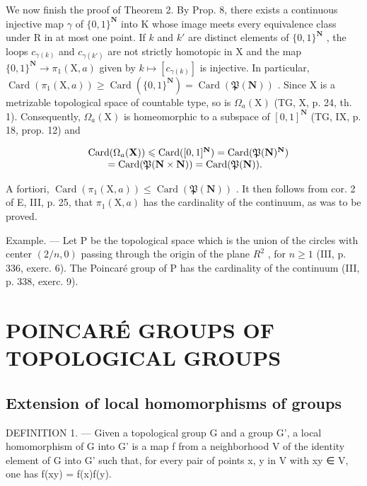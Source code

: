 We now finish the proof of Theorem 2. By Prop. 8, there exists a continuous injective map \(\gamma\) of \(\{0,1\}^{\mathbf{N}}\) into K whose image meets every equivalence class under R in at most one point. If \(k\) and \(k'\) are distinct elements of \(\{0,1\}^{\mathbf{N}}\) , the loops \(c_{\gamma(k)}\) and \(c_{\gamma(k')}\) are not strictly homotopic in X and the map \(\{0,1\}^{\mathbf{N}} \to \pi_1(\mathrm{X},a)\) given by \(k \mapsto [c_{\gamma(k)}]\) is injective. In particular, \(\operatorname{Card}(\pi_1(\mathrm{X},a)) \geqslant \operatorname{Card}(\{0,1\}^{\mathbf{N}}) = \operatorname{Card}(\mathfrak{P}(\mathbf{N}))\) . Since X is a metrizable topological space of countable type, so is \(\Omega_a(\mathrm{X})\) (TG, X, p. 24, th. 1). Consequently, \(\Omega_a(\mathrm{X})\) is homeomorphic to a subspace of \([0,1]^{\mathbf{N}}\) (TG, IX, p. 18, prop. 12) and

\[
\begin{array}{r l} & {\mathrm{Card} (\Omega_ {a} (\mathbf {X})) \leqslant \mathrm{Card} ([ 0, 1 ] ^ {\mathbf {N}}) = \mathrm{Card} (\mathfrak {P} (\mathbf {N}) ^ {\mathbf {N}})} \\ & {\qquad = \mathrm{Card} (\mathfrak {P} (\mathbf {N} \times \mathbf {N})) = \mathrm{Card} (\mathfrak {P} (\mathbf {N})).} \end{array}
\]

A fortiori, \(\operatorname{Card}(\pi_{1}(\mathrm{X},a))\leqslant\operatorname{Card}(\mathfrak{P}(\mathbf{N}))\) . It then follows from cor. 2 of E, III, p. 25, that \(\pi_{1}(\mathrm{X},a)\) has the cardinality of the continuum, as was to be proved.

Example. --- Let P be the topological space which is the union of the circles with center \((2/n,0)\) passing through the origin of the plane \(R^{2}\) , for \(n \geqslant 1\) (III, p. 336, exerc. 6). The Poincaré group of P has the cardinality of the continuum (III, p. 338, exerc. 9).

\section{POINCARÉ GROUPS OF TOPOLOGICAL GROUPS}

\subsection{Extension of local homomorphisms of groups}

DEFINITION 1. --- Given a topological group G and a group G', a local homomorphism of G into G' is a map f from a neighborhood V of the identity element of G into G' such that, for every pair of points x, y in V with xy ∈ V, one has f(xy) = f(x)f(y).

